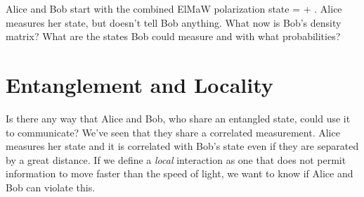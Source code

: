 \begin{exercise}
Alice and Bob start with the combined ElMaW polarization state
\beq
\ket{\Psi} =  + .
\eeq
Alice measures her state, but doesn't tell Bob anything. What now is Bob's density matrix? What are the states Bob could measure and with what probabilities?
\end{exercise}

\section{Entanglement and Locality}
Is there any way that Alice and Bob, who share an entangled state, could use it to communicate? We've seen that they share a correlated measurement. Alice measures her state and it is correlated with Bob's state even if they are separated by a great distance. If we define a {\em local} interaction as one that does not permit information to move faster than the speed of light, we want to know if Alice and Bob can violate this.

